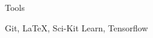 \documentclass[a4paper,9pt]{article}
\begin{document}
\vspace{-3ex}
\begin{minipage}[t]{0.20\linewidth}
	\begin{small}
		\begin{spacing}{1.00}
			\begin{flushright}
				Tools
			\end{flushright}
		\end{spacing}
	\end{small}
\end{minipage}
\hspace{4mm}
\begin{minipage}[t]{0.75\linewidth}
	\begin{small}
		\begin{spacing}{1.00}
			\begin{flushleft}
				Git, \LaTeX, Sci-Kit Learn, Tensorflow
			\end{flushleft}
		\end{spacing}
	\end{small}
\end{minipage}
\end{document}
